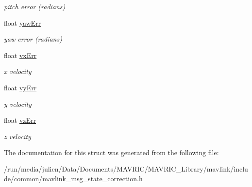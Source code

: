 \begin{DoxyCompactItemize}
\begin{DoxyCompactList}\small\item\em pitch error (radians) \end{DoxyCompactList}\item 
\hypertarget{struct____mavlink__state__correction__t_a22e48f6296de1a6751c7be4df6442aa9}{float \hyperlink{struct____mavlink__state__correction__t_a22e48f6296de1a6751c7be4df6442aa9}{yaw\+Err}}\label{struct____mavlink__state__correction__t_a22e48f6296de1a6751c7be4df6442aa9}

\begin{DoxyCompactList}\small\item\em yaw error (radians) \end{DoxyCompactList}\item 
\hypertarget{struct____mavlink__state__correction__t_a52c6fe18ffee4aee62bbccc79a6bd2cb}{float \hyperlink{struct____mavlink__state__correction__t_a52c6fe18ffee4aee62bbccc79a6bd2cb}{vx\+Err}}\label{struct____mavlink__state__correction__t_a52c6fe18ffee4aee62bbccc79a6bd2cb}

\begin{DoxyCompactList}\small\item\em x velocity \end{DoxyCompactList}\item 
\hypertarget{struct____mavlink__state__correction__t_a2db19032f05d6f0b066d7e9a78fa34a7}{float \hyperlink{struct____mavlink__state__correction__t_a2db19032f05d6f0b066d7e9a78fa34a7}{vy\+Err}}\label{struct____mavlink__state__correction__t_a2db19032f05d6f0b066d7e9a78fa34a7}

\begin{DoxyCompactList}\small\item\em y velocity \end{DoxyCompactList}\item 
\hypertarget{struct____mavlink__state__correction__t_aad12e879c31e56d07fc0a4f95750e701}{float \hyperlink{struct____mavlink__state__correction__t_aad12e879c31e56d07fc0a4f95750e701}{vz\+Err}}\label{struct____mavlink__state__correction__t_aad12e879c31e56d07fc0a4f95750e701}

\begin{DoxyCompactList}\small\item\em z velocity \end{DoxyCompactList}\end{DoxyCompactItemize}


The documentation for this struct was generated from the following file\+:\begin{DoxyCompactItemize}
\item 
/run/media/julien/\+Data/\+Documents/\+M\+A\+V\+R\+I\+C/\+M\+A\+V\+R\+I\+C\+\_\+\+Library/mavlink/include/common/mavlink\+\_\+msg\+\_\+state\+\_\+correction.\+h\end{DoxyCompactItemize}
